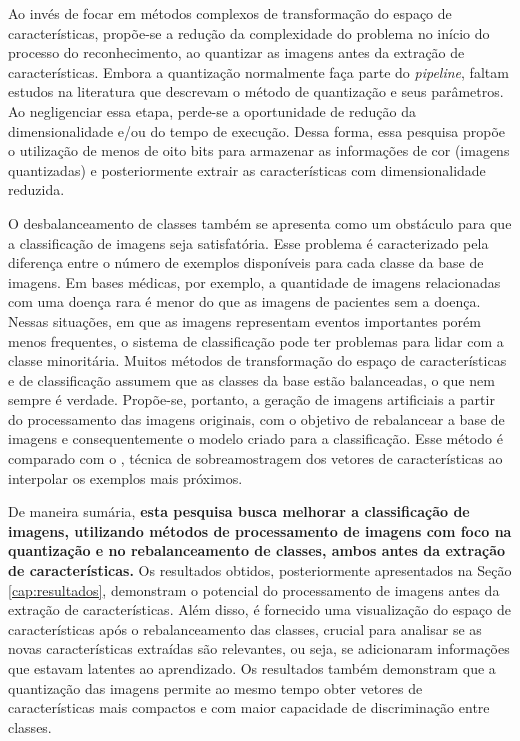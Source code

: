 Ao invés de focar em métodos complexos de transformação do espaço de características, propõe-se a redução da complexidade do problema no início do processo do reconhecimento, ao quantizar as imagens antes da extração de características. Embora a quantização normalmente faça parte do \textit{pipeline}, faltam estudos na literatura que descrevam o método de quantização e seus parâmetros. Ao negligenciar essa etapa, perde-se a oportunidade de redução da dimensionalidade e/ou do tempo de execução. Dessa forma, essa pesquisa propõe o utilização de menos de oito bits para armazenar as informações de cor (imagens quantizadas) e posteriormente extrair as características com dimensionalidade reduzida.

O desbalanceamento de classes também se apresenta como um obstáculo para que a classificação de imagens seja satisfatória. Esse problema é caracterizado pela diferença entre o número de exemplos disponíveis para cada classe da base de imagens. Em bases médicas, por exemplo, a quantidade de imagens relacionadas com uma doença rara é menor do que as imagens de pacientes sem a doença. Nessas situações, em que as imagens representam eventos importantes porém menos frequentes, o sistema de classificação pode ter problemas para lidar com a classe minoritária. Muitos métodos de transformação do espaço de características e de classificação assumem que as classes da base estão balanceadas, o que nem sempre é verdade. Propõe-se, portanto, a geração de imagens artificiais a partir do processamento das imagens originais, com o objetivo de rebalancear a base de imagens e consequentemente o modelo criado para a classificação. Esse método é comparado com o , técnica de sobreamostragem dos vetores de características ao interpolar os exemplos mais próximos.

De maneira sumária, \textbf{esta pesquisa busca melhorar a classificação de imagens, utilizando métodos de processamento de imagens com foco na quantização e no rebalanceamento de classes, ambos antes da extração de características.} Os resultados obtidos, posteriormente apresentados na Seção \ref{cap:resultados}, demonstram o potencial do processamento de imagens antes da extração de características. Além disso, é fornecido uma visualização do espaço de características após o rebalanceamento das classes, crucial para analisar se as novas características extraídas são relevantes, ou seja, se adicionaram informações que estavam latentes ao aprendizado. Os resultados também demonstram que a quantização das imagens permite ao mesmo tempo obter vetores de características mais compactos e com maior capacidade de discriminação entre classes.



